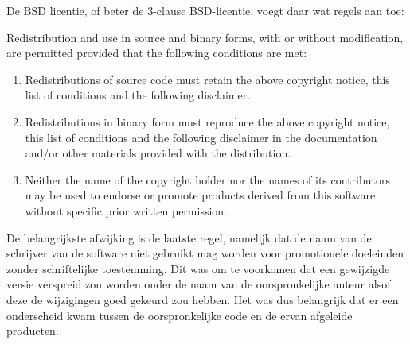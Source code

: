 De BSD licentie, of beter de 3-clause BSD-licentie, voegt daar wat regels aan toe:

\bigskip

Redistribution and use in source and binary forms, with or without modification, are permitted provided that the
following conditions are met:

\begin{enumerate}
\item Redistributions of source code must retain the above copyright notice, this list of conditions and the following
disclaimer.
\item Redistributions in binary form must reproduce the above copyright notice, this list of conditions and the following
disclaimer in the documentation and/or other materials provided with the distribution.
\item Neither the name of the copyright holder nor the names of its contributors may be used to endorse or promote products
derived from this software without specific prior written permission.
\end{enumerate}

\bigskip

De belangrijkste afwijking is de laatste regel, namelijk dat de naam van de schrijver van de software niet gebruikt mag
worden voor promotionele doeleinden zonder schriftelijke toestemming. Dit was om te voorkomen dat een gewijzigde versie
verspreid zou worden onder de naam van de oorspronkelijke auteur alsof deze de wijzigingen goed gekeurd zou hebben. Het
was dus belangrijk dat er een onderscheid kwam tussen de oorspronkelijke code en de ervan afgeleide producten.
